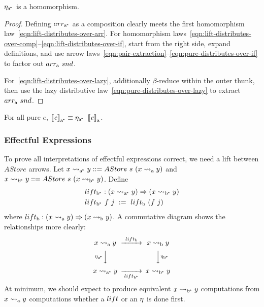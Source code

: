 \begin{theorem}
$\eta_\mathrm{a^{\mspace{-2mu}*}}$ is a homomorphism.
\end{theorem}
\begin{proof}
Defining $arr_\mathrm{a^{\mspace{-2mu}*}}$ as a composition clearly meets the first homomorphism law~\eqref{eqn:lift-distributes-over-arr}.
For homomorphism laws~\eqref{eqn:lift-distributes-over-comp}--\eqref{eqn:lift-distributes-over-if}, start from the right side, expand definitions, and use arrow laws~\eqref{eqn:pair-extraction}--\eqref{eqn:pure-distributes-over-if} to factor out $arr_\mathrm{a}~snd$.

For~\eqref{eqn:lift-distributes-over-lazy}, additionally $\beta$-reduce within the outer thunk, then use the lazy distributive law~\eqref{eqn:pure-distributes-over-lazy} to extract $arr_\mathrm{a}~snd$.
\end{proof}

\begin{corollary}
\label{cor:pure-astore-semantic-correctness}
For all pure $\mathit{e}$, $\left\llbracket{\mathit{e}}\right\rrbracket_\mathrm{a^{\mspace{-2mu}*}} \equiv \eta_\mathrm{a^{\mspace{-2mu}*}}~\left\llbracket{\mathit{e}}\right\rrbracket_\mathrm{a}$.
\end{corollary}

\subsubsection{Effectful Expressions}
To prove all interpretations of effectful expressions correct, we need a lift between $AStore$ arrows.
Let $x \rightsquigarrow_\mathrm{a^{\mspace{-2mu}*}} y ::= AStore~s~(x \rightsquigarrow_\mathrm{a} y)$ and $x \rightsquigarrow_\mathrm{b^{\mspace{-2mu}*}} y ::= AStore~s~(x \rightsquigarrow_\mathrm{b^{\mspace{-2mu}*}} y)$.
Define
\begin{equation}
\begin{aligned}
	&lift_\mathrm{b^{\mspace{-2mu}*}} : (x \rightsquigarrow_\mathrm{a^{\mspace{-2mu}*}} y) \Rightarrow (x \rightsquigarrow_\mathrm{b^{\mspace{-2mu}*}} y) \\
	&lift_\mathrm{b^{\mspace{-2mu}*}}~f~j \ := \ lift_\mathrm{b}~(f~j)
\end{aligned}
\end{equation}
where $lift_\mathrm{b} : (x \rightsquigarrow_\mathrm{a} y) \Rightarrow (x \rightsquigarrow_\mathrm{b} y)$.
A commutative diagram shows the relationships more clearly:
\begin{equation}
\begin{CD}
	x \arrow\gen y @>{\arrowlift\genb}>> x \arrow\genb y \\
	@V{\arrowtrans\genc}VV @VV{\arrowtrans\gend}V \\
	x \arrow\genc y @>>{\arrowlift\gend}> x \arrow\gend y
\end{CD}
\label{eqn:lift-diagram}
\end{equation}
At minimum, we should expect to produce equivalent $x \rightsquigarrow_\mathrm{b^{\mspace{-2mu}*}} y$ computations from $x \rightsquigarrow_\mathrm{a} y$ computations whether a $lift$ or an $\eta$ is done first.


